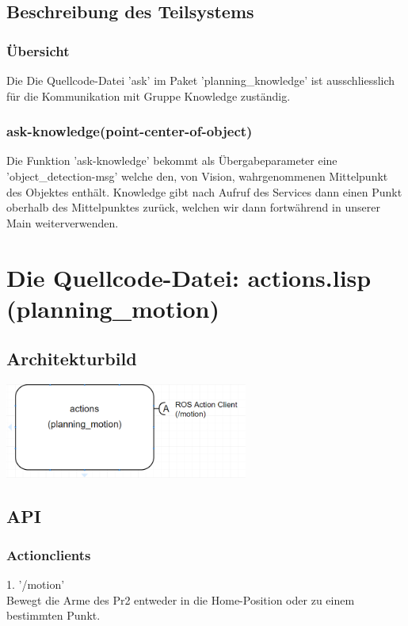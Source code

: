 \documentclass{suturo}
\begin{document}
\subsection{Beschreibung des Teilsystems}
\subsubsection{\"Ubersicht}
Die Die Quellcode-Datei 'ask' im Paket 'planning\_knowledge' ist ausschliesslich für die Kommunikation mit Gruppe Knowledge zust\"andig.
\subsubsection{ask-knowledge(point-center-of-object)}
Die Funktion 'ask-knowledge' bekommt als \"Ubergabeparameter eine 'object\_detection-msg' welche den, von Vision, wahrgenommenen Mittelpunkt des Objektes enthält. Knowledge gibt nach Aufruf des Services dann einen Punkt oberhalb des Mittelpunktes zur\"uck, welchen wir dann fortw\"ahrend in unserer Main weiterverwenden.

\section{Die Quellcode-Datei: actions.lisp (planning\_motion)}
\subsection{Architekturbild}
\begin{center} \includegraphics[width=0.6\textwidth]{img/diag_planning_motion.png} \end{center}
\subsection{API}
\subsubsection{Actionclients}
1. '/motion' \\
Bewegt die Arme des Pr2 entweder in die Home-Position oder zu einem bestimmten Punkt.
\end{document}

